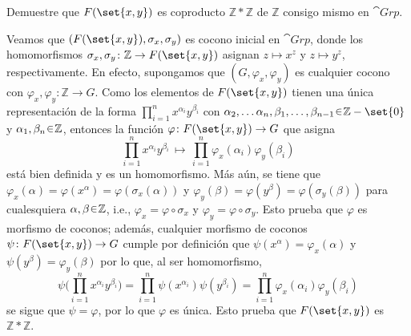 \begin{ejer}
    Demuestre que $F(\set{x,y})$ es coproducto $\mathbb{Z} *\mathbb{Z}$ de $\mathbb{Z}$ consigo mismo en $\cat{Grp}$.
\end{ejer}
\begin{sol}
    Veamos que $(F(\set{x,y}), \sigma_x, \sigma_y)$ es cocono inicial en $\cat{Grp}$, donde los homomorfismos $\sigma_x, \sigma_y \colon \mathbb{Z} \to F(\set{x,y})$ asignan $z \mapsto x^z$ y $z \mapsto y^z$, respectivamente. En efecto, supongamos que $(G, \varphi_x, \varphi_y)$ es cualquier cocono con $\varphi_x, \varphi_y \colon \mathbb{Z} \to G$. Como los elementos de $F(\set{x,y})$ tienen una única representación de la forma $\prod^n_{i=1}x^{\alpha_i}y^{\beta_i}$ con $\alpha_2, \dots\alpha_n, \beta_1, \dots, \beta_{n-1}\en \mathbb{Z}-\set{0}$ y $\alpha_1,\beta_n \en \mathbb{Z}$,
    entonces la función $\varphi \colon F(\set{x,y}) \to G$ que asigna
    \[
        \prod^n_{i=1} x^{\alpha_i}y^{\beta_i}%
        \,\mapsto\,%
        \prod^n_{i=1} \varphi_x(\alpha_i)\varphi_y(\beta_i)
    \]
    está bien definida y es un homomorfismo. Más aún, se tiene que $\varphi_x(\alpha) =\varphi(x^\alpha) = \varphi(\sigma_x(\alpha))$ y $\varphi_y(\beta) =\varphi(y^\beta) = \varphi(\sigma_y(\beta))$ para cualesquiera $\alpha, \beta \en \mathbb{Z}$, i.e., $\varphi_x = \varphi \circ \sigma_x$ y $\varphi_y = \varphi \circ \sigma_y$. Esto prueba que $\varphi$ es morfismo de coconos; además, cualquier morfismo de coconos $\psi \colon F(\set{x,y}) \to G$ cumple por definición que $\psi(x^\alpha) = \varphi_x(\alpha)$ y $\psi(y^\beta) = \varphi_y(\beta)$ por lo que, al ser homomorfismo, 
    \[
        \psi\bigg(%
            \prod^n_{i=1} x^{\alpha_i} y^{\beta_i}  
        \bigg)%
        = \prod^n_{i=1} \psi(x^{\alpha_i})\psi(y^{\beta_i})%
        = \prod^n_{i=1} \varphi_x(\alpha_i)\varphi_y(\beta_i)
    \]
    se sigue que $\psi = \varphi$, por lo que $\varphi$ es única. Esto prueba que $F(\set{x,y})$ es $\mathbb{Z} * \mathbb{Z}$.
\end{sol}

